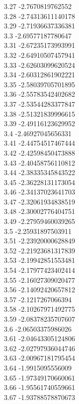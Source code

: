{3.27	-2.7670819762552\\
3.28	-2.74313611140178\\
3.29	-2.71936637336381\\
3.3	-2.69577187780647\\
3.31	-2.67235173993991\\
3.32	-2.64910507457941\\
3.33	-2.62603099620524\\
3.34	-2.60312861902221\\
3.35	-2.58039705701895\\
3.36	-2.55783542402682\\
3.37	-2.53544283377847\\
3.38	-2.51321839996615\\
3.39	-2.49116123629952\\
3.4	-2.46927045656331\\
3.41	-2.44754517467444\\
3.42	-2.42598450473888\\
3.43	-2.40458756110812\\
3.44	-2.38335345843522\\
3.45	-2.36228131173054\\
3.46	-2.34137023641703\\
3.47	-2.32061934838519\\
3.48	-2.30002776404751\\
3.49	-2.27959460039265\\
3.5	-2.25931897503911\\
3.51	-2.23920000628849\\
3.52	-2.21923681317839\\
3.53	-2.19942851553481\\
3.54	-2.17977423402414\\
3.55	-2.16027309020477\\
3.56	-2.14092420657812\\
3.57	-2.1217267066394\\
3.58	-2.10267971492775\\
3.59	-2.08378235707607\\
3.6	-2.06503375986026\\
3.61	-2.04643305124806\\
3.62	-2.02797936044746\\
3.63	-2.00967181795454\\
3.64	-1.9915095556009\\
3.65	-1.97349170660061\\
3.66	-1.95561740559661\\
3.67	-1.93788578870673\\
}
